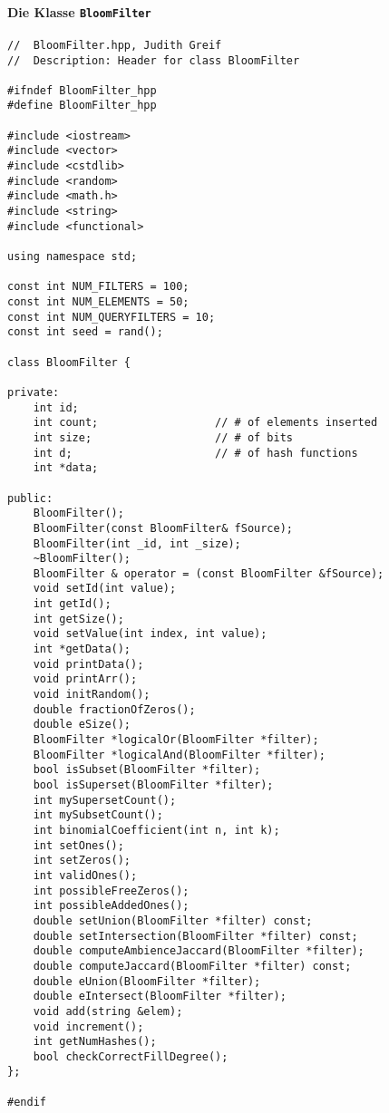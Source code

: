 \paragraph*{Die Klasse \texttt{BloomFilter}}
\small{
\begin{verbatim}
//  BloomFilter.hpp, Judith Greif
//  Description: Header for class BloomFilter

#ifndef BloomFilter_hpp
#define BloomFilter_hpp

#include <iostream>
#include <vector>
#include <cstdlib>
#include <random>
#include <math.h>
#include <string>
#include <functional>

using namespace std;

const int NUM_FILTERS = 100;
const int NUM_ELEMENTS = 50;
const int NUM_QUERYFILTERS = 10;
const int seed = rand();

class BloomFilter {
    
private:
    int id;
    int count;                  // # of elements inserted
    int size;                   // # of bits
    int d;                      // # of hash functions
    int *data;
    
public:
    BloomFilter();
    BloomFilter(const BloomFilter& fSource);
    BloomFilter(int _id, int _size);
    ~BloomFilter();   
    BloomFilter & operator = (const BloomFilter &fSource);   
    void setId(int value);
    int getId();
    int getSize();
    void setValue(int index, int value);
    int *getData();   
    void printData();
    void printArr();
    void initRandom();
    double fractionOfZeros();
    double eSize();
    BloomFilter *logicalOr(BloomFilter *filter);
    BloomFilter *logicalAnd(BloomFilter *filter);
    bool isSubset(BloomFilter *filter);
    bool isSuperset(BloomFilter *filter);
    int mySupersetCount();
    int mySubsetCount();
    int binomialCoefficient(int n, int k);
    int setOnes();
    int setZeros();
    int validOnes();
    int possibleFreeZeros();
    int possibleAddedOnes();
    double setUnion(BloomFilter *filter) const;
    double setIntersection(BloomFilter *filter) const;
    double computeAmbienceJaccard(BloomFilter *filter);
    double computeJaccard(BloomFilter *filter) const;
    double eUnion(BloomFilter *filter);
    double eIntersect(BloomFilter *filter);
    void add(string &elem);
    void increment();
    int getNumHashes();
    bool checkCorrectFillDegree();
};

#endif
\end{verbatim}
}
\newpage
